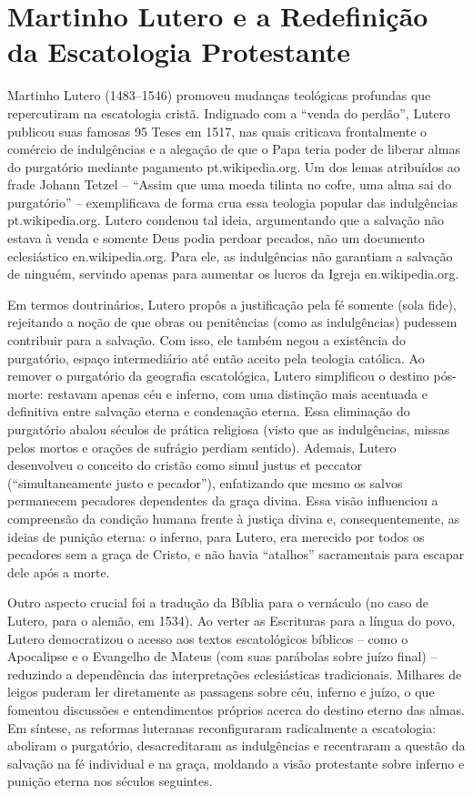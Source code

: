 \section{Martinho Lutero e a Redefinição da Escatologia Protestante}

Martinho Lutero (1483--1546) promoveu mudanças teológicas profundas que repercutiram na escatologia cristã. Indignado com a “venda do perdão”, Lutero publicou suas famosas 95 Teses em 1517, nas quais criticava frontalmente o comércio de indulgências e a alegação de que o Papa teria poder de liberar almas do purgatório mediante pagamento pt.wikipedia.org. Um dos lemas atribuídos ao frade Johann Tetzel -- “Assim que uma moeda tilinta no cofre, uma alma sai do purgatório” -- exemplificava de forma crua essa teologia popular das indulgências pt.wikipedia.org. Lutero condenou tal ideia, argumentando que a salvação não estava à venda e somente Deus podia perdoar pecados, não um documento eclesiástico en.wikipedia.org. Para ele, as indulgências não garantiam a salvação de ninguém, servindo apenas para aumentar os lucros da Igreja en.wikipedia.org.

Em termos doutrinários, Lutero propôs a justificação pela fé somente (sola fide), rejeitando a noção de que obras ou penitências (como as indulgências) pudessem contribuir para a salvação. Com isso, ele também negou a existência do purgatório, espaço intermediário até então aceito pela teologia católica. Ao remover o purgatório da geografia escatológica, Lutero simplificou o destino pós-morte: restavam apenas céu e inferno, com uma distinção mais acentuada e definitiva entre salvação eterna e condenação eterna. Essa eliminação do purgatório abalou séculos de prática religiosa (visto que as indulgências, missas pelos mortos e orações de sufrágio perdiam sentido). Ademais, Lutero desenvolveu o conceito do cristão como simul justus et peccator (“simultaneamente justo e pecador”), enfatizando que mesmo os salvos permanecem pecadores dependentes da graça divina. Essa visão influenciou a compreensão da condição humana frente à justiça divina e, consequentemente, as ideias de punição eterna: o inferno, para Lutero, era merecido por todos os pecadores sem a graça de Cristo, e não havia “atalhos” sacramentais para escapar dele após a morte.

Outro aspecto crucial foi a tradução da Bíblia para o vernáculo (no caso de Lutero, para o alemão, em 1534). Ao verter as Escrituras para a língua do povo, Lutero democratizou o acesso aos textos escatológicos bíblicos -- como o Apocalipse e o Evangelho de Mateus (com suas parábolas sobre juízo final) -- reduzindo a dependência das interpretações eclesiásticas tradicionais. Milhares de leigos puderam ler diretamente as passagens sobre céu, inferno e juízo, o que fomentou discussões e entendimentos próprios acerca do destino eterno das almas. Em síntese, as reformas luteranas reconfiguraram radicalmente a escatologia: aboliram o purgatório, desacreditaram as indulgências e recentraram a questão da salvação na fé individual e na graça, moldando a visão protestante sobre inferno e punição eterna nos séculos seguintes.

